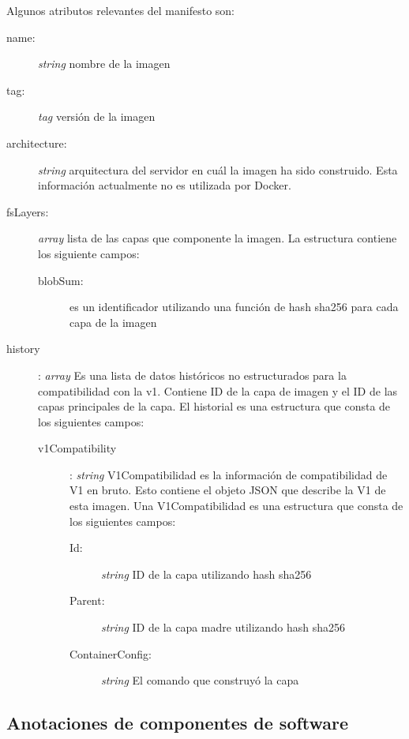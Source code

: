  
Algunos atributos relevantes del manifesto son:

\begin{description}
	\item [name:] \textit{string} nombre de la imagen
	\item [tag:] \textit{tag} versión de la imagen
	\item [architecture:] \textit{string} arquitectura del servidor en cuál la imagen ha sido construido. Esta información actualmente no es utilizada por Docker.
	\item [fsLayers:] \textit{array} lista de las capas que componente la imagen.
		La estructura contiene los siguiente campos:
		\begin{description}
			\item [blobSum:] es un identificador utilizando una función de hash sha256 para cada capa de la imagen 
		\end{description}
	\item [history]: \textit{array} Es una lista de datos históricos no estructurados para la compatibilidad con la v1. Contiene ID de la capa de imagen y el ID de las capas principales de la capa. El historial es una estructura que consta de los siguientes campos:
	\begin{description}
		\item[v1Compatibility]:  \textit{string} V1Compatibilidad es la información de compatibilidad de V1 en bruto. Esto contiene el objeto JSON que describe la V1 de esta imagen. Una V1Compatibilidad es una estructura que consta de los siguientes campos:
		
		\begin{description}
			\item [Id:] \textit{string} ID de la capa utilizando hash sha256			\item [Parent:] \textit{string} ID de la capa madre utilizando hash sha256
				\item [ContainerConfig:] \textit{string} El comando que construyó la capa
		\end{description}
	\end{description}
\end{description}



\subsection{Anotaciones de componentes de software}\label{s4.2.2}


